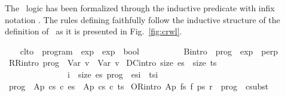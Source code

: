 \documentclass{llncs}
\newenvironment{isacode}
{\begin{list}{}{
\setlength{\leftmargin}{4pt}
\setlength{\rightmargin}{0pt}
\setlength{\listparindent}{0pt}\raggedright
\setlength{\itemsep}{0pt}
\setlength{\parsep}{0pt}
\normalfont\ttfamily }\item[]}
{\end{list}}
\begin{document}
The \crwl\ logic has been formalized through the inductive predicate
 with infix notation
\isaelem{{\isachardoublequoteopen}{\isacharunderscore}\
  {\isasymturnstile}\ {\isacharunderscore}\ {\isasymrightarrow}\
  {\isacharunderscore}{\isachardoublequoteclose}}. The rules defining
\isaelem{clto} faithfully follow the inductive structure of the
definition of \crwl\ as it is presented in Fig.~\ref{fig:crwl}.

\medskip

\begin{minipage}{\linewidth} \begin{isacode}
\isamarkupfalse \ \isanewline
\ \ clto\ {\isacharcolon}{\isacharcolon}\ {\isachardoublequoteopen}program\ {\isasymRightarrow}\ exp\ {\isasymRightarrow}\ exp\ {\isasymRightarrow}\ bool{\isachardoublequoteclose}\ \ {\isacharparenleft}{\isachardoublequoteopen}{\isacharunderscore}\ {\isasymturnstile}\ {\isacharunderscore}\ {\isasymrightarrow}\ {\isacharunderscore}{\isachardoublequoteclose}\ {\isacharbrackleft}{}{}{}{\isacharcomma}{}{}{\isacharcomma}{}{}{\isacharbrackright}\ {}{}{\isacharparenright}\isanewline
\isakeyword{where}\isanewline
\ \ B{\isacharbrackleft}intro{\isacharbrackright}{\isacharcolon}\ \ {\isachardoublequoteopen}prog\ {\isasymturnstile}\ exp\ {\isasymrightarrow}\ perp{\isachardoublequoteclose}\isanewline
{\isacharbar}\ RR{\isacharbrackleft}intro{\isacharbrackright}{\isacharcolon}\ {\isachardoublequoteopen}prog\ {\isasymturnstile}\ Var\ v\ {\isasymrightarrow}\ Var\ v{\isachardoublequoteclose}\isanewline
{\isacharbar}\ DC{\isacharbrackleft}intro{\isacharbrackright}{\isacharcolon}\ {\isachardoublequoteopen}{\isasymlbrakk}size\ es\ {\isacharequal}\ size\ ts{\isacharsemicolon}\isanewline
\ \ \ \ \ \ \ \ \ \ \ \ \ \ \ {\isasymforall}i\ {\isacharless}\ size\ es{\isachardot}\ prog\ {\isasymturnstile}\ es{\isacharbang}i\ {\isasymrightarrow}\ ts{\isacharbang}i\isanewline
\ \ \ \ \ \ \ \ \ \ \ \ \ \ {\isasymrbrakk} {\isasymLongrightarrow}\ prog\ {\isasymturnstile}\ Ap\ {\isacharparenleft}cs\ c{\isacharparenright}\ es\ {\isasymrightarrow}\ Ap\ {\isacharparenleft}cs\ c{\isacharparenright}\ ts{\isachardoublequoteclose}\isanewline
{\isacharbar}\ OR{\isacharbrackleft}intro{\isacharbrackright}{\isacharcolon}\ {\isachardoublequoteopen}{\isasymlbrakk}{\isacharparenleft}Ap\ {\isacharparenleft}fs\ f{\isacharparenright}\ ps{\isacharcomma}\ r{\isacharparenright}\ {\isasymin}\ prog\ {\isacharsemicolon}\ csubst\ {\isasymtheta}\ {\isacharsemicolon}\isanewline

\end{isacode}
\end{minipage}
\end{document}
